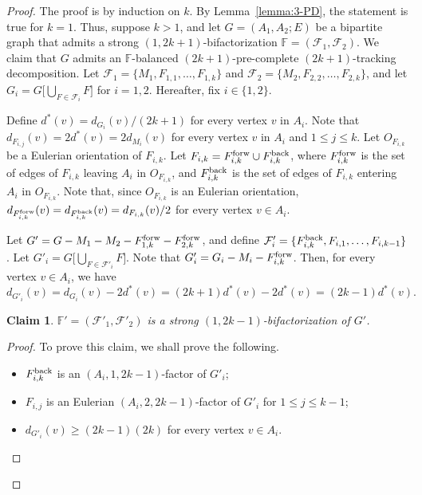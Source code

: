 \documentclass[12pt,reqno,a4paper]{amsart}
\newtheorem{claim}[theorem]{Claim}
\def\back{\mathop{\text{\rm back}}\nolimits}
\def\forw{\mathop{\text{\rm forw}}\nolimits}
\begin{document}
\begin{proof}
The proof is by induction on \(k\).
By Lemma~\ref{lemma:3-PD}, the statement is true for \(k=1\).
Thus, suppose \(k>1\),
and let \(G = (A_1,A_2;E)\) be a bipartite graph that admits a strong  
\((1,2k+1)\)-bifactorization \(\mathbb{F} = (\mathcal{F}_1,\mathcal{F}_2)\).
We claim that \(G\) admits an \(\mathbb{F}\)-balanced 
\((2k+1)\)-pre-complete 
$(2k+1)$-tracking decomposition.
Let \(\mathcal{F}_1 = \{M_1,F_{1,1},\ldots,F_{1,k}\}\) 
and \(\mathcal{F}_2 = \{M_2,F_{2,2},\ldots,F_{2,k}\}\),
and let \(G_i = G\big[\bigcup_{F\in\mathcal{F}_i} F\big]\) for \(i = 1,2\).
Hereafter, fix $i \in \{1,2\}$.

Define \(d^*(v) = 
d_{G_i}(v)/(2k+1)\) for every vertex \(v\) in \(A_i\).
Note that \(d_{F_{i,j}}(v) = 2d^*(v) = 2d_{M_i}(v)\) for every vertex \(v\) in 
\(A_i\) and \(1\leq j\leq k\). 
Let \(O_{F_{i,k}}\) be a Eulerian 
orientation of \(F_{i,k}\).
Let \(F_{i,k} = F_{i,k}^{\forw} \cup F_{i,k}^{\back}\), where 
\(F_{i,k}^{\forw}\) is the set of 
edges
of \(F_{i,k}\) leaving \(A_i\) in \(O_{F_{i,k}}\),
and \(F_{i,k}^{\back}\) is the set of edges of \(F_{i,k}\) entering
\(A_i\)
in \(O_{F_{i,k}}\).
Note that, since \(O_{F_{i,k}}\) is an Eulerian orientation,
\(d_{F_{i,k}^{\forw}}(v) = d_{F_{i,k}^{\back}}(v) = d_{F_{i,k}}(v)/2\) for 
every 
vertex \(v\in A_i\).

Let \(G' = G - M_1 - M_2 - F_{1,k}^{\forw} - F_{2,k}^{\forw}\),
and define \(\mathcal{F}'_i = \{F_{i,k}^{\back},F_{i,1},\ldots, F_{i,k-1}\}\).
Let \(G'_i = G\big[\bigcup_{F\in\mathcal{F}'_i} F\big]\).
Note that \(G'_i = G_i - M_i - F_{i,k}^{\forw}\).
Then, for every vertex \(v\in A_i\), we have
\begin{equation}\label{odd-d}
d_{G'_i}(v) = d_{G_i}(v) - 2d^*(v) 
	    = (2k+1)d^*(v) - 2d^*(v) 
	    = (2k-1)d^*(v).
\end{equation}

\begin{claim}
\(\mathbb{F}' = (\mathcal{F}'_1,\mathcal{F}'_2)\) is a strong 
\((1,2k-1)\)-bifactorization of \(G'\).
\end{claim}

\begin{proof}

To prove this claim, we shall prove the following.
\begin{itemize}
	\item[(i)] \(F_{i,k}^{\back}\) is an \((A_i,1,2k-1)\)-factor of 
\(G'_i\);
	\item[(ii)] \(F_{i,j}\) is an Eulerian \((A_i,2,2k-1)\)-factor 
			of \(G'_i\) for \(1\leq j\leq k-1\);
	\item[(iii)] \(d_{G'_i}(v) \geq (2k-1)(2k)\) for every vertex \(v\in 
A_i\).
\end{itemize}


\end{proof}
\end{proof}
\end{document}
